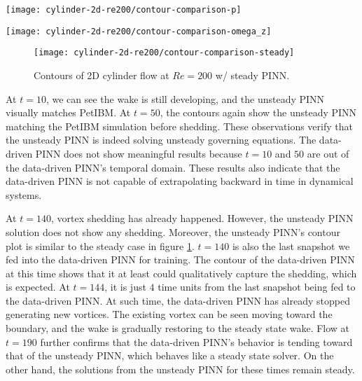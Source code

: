 \begin{figure*}
    \centering%
    \texttt{[image: cylinder-2d-re200/contour-comparison-p]}%
    \caption{%
        Pressure comparison of 2D cylinder flow of $Re=\num{200}$ between PetIBM, unsteady PINN, and data-driven PINN.
    }
    \label{fig:cylinder-re200-pinn-contours-p}%
\end{figure*}

\begin{figure*}
    \centering%
    \texttt{[image: cylinder-2d-re200/contour-comparison-omega\_z]}%
    \caption{%
        Vorticity ($\omega_z$) comparison of 2D cylinder flow of $Re=\num{200}$ between PetIBM, unsteady PINN, and data-driven PINN.
    }
    \label{fig:cylinder-re200-pinn-contours-omega_z}%
\end{figure*}

\begin{figure}[t]
    \centering%
    \texttt{[image: cylinder-2d-re200/contour-comparison-steady]}%
    \caption{%
        Contours of 2D cylinder flow at $Re=\num{200}$ w/ steady PINN.
    }
    \label{fig:cylinder-re200-steady-pinn-contours}%
\end{figure}

At $t=10$, we can see the wake is still developing, and the unsteady PINN visually matches PetIBM.
At $t=50$, the contours again show the unsteady PINN matching the PetIBM simulation before shedding.
These observations verify that the unsteady PINN is indeed solving unsteady governing equations.
The data-driven PINN does not show meaningful results because $t=10$ and $50$ are out of the data-driven PINN's temporal domain.
These results also indicate that the data-driven PINN is not capable of extrapolating backward in time in dynamical systems.

At $t=140$, vortex shedding has already happened.
However, the unsteady PINN solution does not show any shedding.
Moreover, the unsteady PINN's contour plot is similar to the steady case in figure \ref{fig:cylinder-re200-steady-pinn-contours}.
$t=140$ is also the last snapshot we fed into the data-driven PINN for training.
The contour of the data-driven PINN at this time shows that it at least could qualitatively capture the shedding, which is expected.
At $t=144$, it is just $4$ time units from the last snapshot being fed to the data-driven PINN.
At such time, the data-driven PINN has already stopped generating new vortices.
The existing vortex can be seen moving toward the boundary, and the wake is gradually restoring to the steady state wake.
Flow at $t=190$ further confirms that the data-driven PINN's behavior is tending toward that of the unsteady PINN, which behaves like a steady state solver.
On the other hand, the solutions from the unsteady PINN for these times remain steady.

